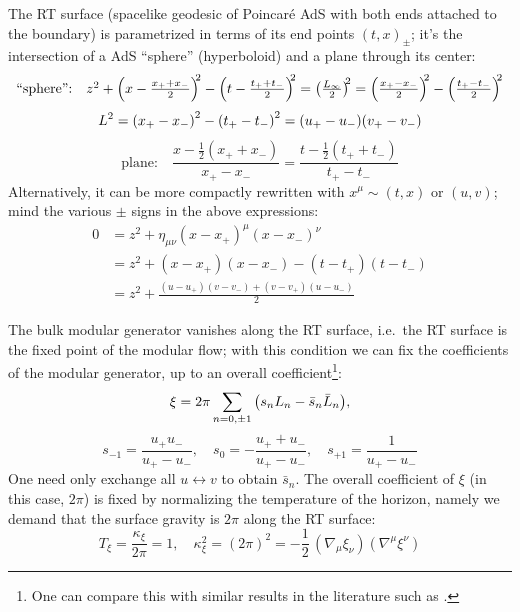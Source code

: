 \documentclass[11pt,a4paper]{article}
\begin{document}
	The RT surface (spacelike geodesic of Poincar\'e AdS with both ends attached to the boundary) is parametrized in terms of its end points $(t,x)_\pm$; it's the intersection of a AdS ``sphere'' (hyperboloid) and a plane through its center:
	\begin{equation}
	\text{``sphere'':}\quad\mathsmaller{
		z^2
		+ \pqty{x - \frac{x_+ + x_-}{2}}^{\!\!2}
		- \pqty{t - \frac{t_+ + t_-}{2}}^{\!\!2}
		= \pqty{\frac{L_\infty}{2}}^{\!\!2}
		= \pqty{\frac{x_+ - x_-}{2}}^{\!\!2}
		- \pqty{\frac{t_+ - t_-}{2}}^{\!\!2}
	}
	\end{equation}
	\begin{equation}
		L^2
		= \pqty{x_+ - x_-}^2
			- \pqty{t_+ - t_-}^2
		= (u_+ - u_-)(v_+ - v_-)
	\end{equation}
	\begin{equation}
	\text{plane:}\quad
		\frac{x - \frac{1}{2} (x_+ + x_-)}{x_+ - x_-}
		= \frac{t - \frac{1}{2} (t_+ + t_-)}{t_+ - t_-}
	\end{equation}
	Alternatively, it can be more compactly rewritten with $x^\mu \sim (t,x)$ or $(u,v)$; mind the various $\pm$ signs in the above expressions: 
	\begin{equation}
	\begin{aligned}
		0 &= z^2
			+ \eta_{\mu\nu} (x - x_+)^\mu (x - x_-)^\nu \\
		& = z^2
			+ (x - x_+)(x - x_-)
			- (t - t_+)(t - t_-) \\
		&= z^2 + \frac{
				(u - u_+)(v - v_-)
				+ (v - v_+)(u - u_-)
			}{2}
	\end{aligned}
	\end{equation}
	
	The bulk modular generator vanishes along the RT surface, i.e.~the RT surface is the fixed point of the modular flow; with this condition we can fix the coefficients of the modular generator, up to an overall coefficient\footnote{
		One can compare this with similar results in the literature such as \cite{Lashkari:2016idm,Czech:2019vih,Apolo:2020qjm}. 
	}:
	\begin{equation}
		\xi = 2\pi \sum_{n=0,\pm 1} \pqty{
				s_n L_n - \bar{s}_n \bar{L}_n
			},
	\end{equation}
	\begin{equation}
		s_{-1} = \frac{u_+ u_-}{u_+ - u_-},\quad
		s_0 = - \frac{u_+ + u_-}{u_+ - u_-},\quad
		s_{+1} = \frac{1}{u_+ - u_-}
	\end{equation}
	One need only exchange all $u\leftrightarrow v$ to obtain $\bar{s}_n$. The overall coefficient of $\xi$ (in this case, $2\pi$) is fixed by normalizing the temperature of the horizon, namely we demand that the surface gravity is $2\pi$ along the RT surface:
	\begin{equation}
		T_\xi = \frac{\kappa_\xi}{2\pi} = 1,
	\quad
		\kappa_\xi^2
		= (2\pi)^2
		= -\frac{1}{2}\,
			(\nabla_{\mu} \xi_{\nu})
			(\nabla^{\mu} \xi^{\nu})
	\end{equation}
	
\end{document}

